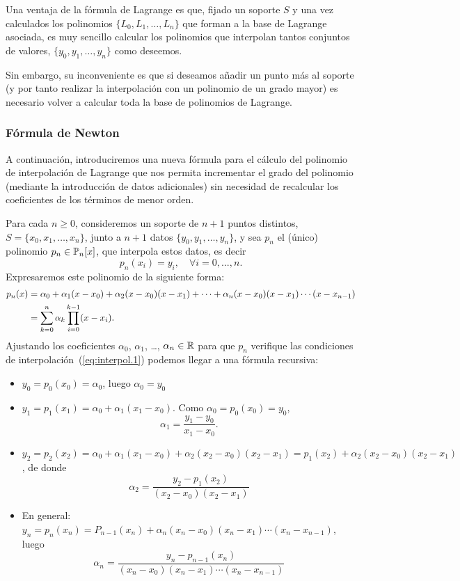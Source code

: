 \begin{remark}
  Una ventaja de la fórmula de Lagrange es que, fijado un soporte $S$
  y una vez calculados los polinomios $\{L_0,L_1,\dots, L_n\}$ que
  forman a la base de Lagrange asociada, es muy sencillo calcular los
  polinomios que interpolan tantos conjuntos de valores,
  $\{y_0,y_1,\dots,y_n\}$ como deseemos.

  Sin embargo, su inconveniente es que si deseamos añadir un punto más
  al soporte (y por tanto realizar la interpolación con un polinomio
  de un grado mayor) es necesario volver a calcular toda la base de
  polinomios de Lagrange.
\end{remark}

\subsubsection{Fórmula de Newton}
\label{sec:formula-de-newton}
A continuación, introduciremos una nueva fórmula para el cálculo del polinomio de interpolación de Lagrange que nos permita incrementar el grado del polinomio (mediante la introducción de datos adicionales) sin necesidad de recalcular los coeficientes de los términos de menor orden.

Para cada $n\ge 0$, consideremos un soporte de $n+1$ puntos distintos,
$S=\{x_0,x_1,\dots,x_n\}$, junto a $n+1$
datos $\{y_0,y_1,\dots,y_n\}$, y sea $p_n$ el (único) polinomio
$p_n \in \operatorname{{\mathbb P}}_n[x]$, que interpola estos datos, es
decir
\begin{equation}
  p_n(x_i)=y_i, \quad \forall i=0,...,n.
  \label{eq:interpol.1}
\end{equation}
Expresaremos este polinomio de la siguiente forma:
\begin{align}
  \notag
  p_n(x)&=\alpha_0 + \alpha_1 (x-x_0) + \alpha_2(x-x_0)(x-x_1) + \cdots
          + \alpha_n(x-x_0)(x-x_1)\cdots(x-x_{n-1}) \\
        &=\sum_{k=0}^n \alpha_k \prod_{i=0}^{k-1}(x-x_i).
          \label{eq:pol.newton.dif-div}
\end{align}
Ajustando los coeficientes $\alpha_0$, $\alpha_1$, \dots,
$\alpha_n\in\operatorname{{\mathbb R}}$ para que $p_n$ verifique las condiciones de
interpolación~(\ref{eq:interpol.1}) podemos llegar a una fórmula recursiva:
\begin{itemize}
\item $y_0=p_0(x_0)=\alpha_0$, luego $\alpha_0=y_0$
\item $y_1=p_1(x_1)=\alpha_0+\alpha_1(x_1-x_0)$. Como $\alpha_0=p_0(x_0)=y_0$,
  $$
  \alpha_1=\frac{y_1-y_0}{x_1-x_0}.
  $$

\item $y_2=p_2(x_2)=\alpha_0+\alpha_1(x_1-x_0)+\alpha_2(x_2-x_0)(x_2-x_1)=p_1(x_2) +\alpha_2(x_2-x_0)(x_2-x_1)$, de donde
  $$
  \alpha_2= \frac{y_2-p_1(x_2)}{(x_2-x_0)(x_2-x_1)}
  $$

\item En general: $y_n=p_n(x_n)=P_{n-1}(x_n) + \alpha_n(x_n-x_0)(x_n-x_1)\cdots(x_n-x_{n-1})$, luego
  $$
  \alpha_n= \frac{y_n-p_{n-1}(x_n)}{(x_n-x_0)(x_n-x_1)\cdots(x_n-x_{n-1})}
  $$
\end{itemize}

